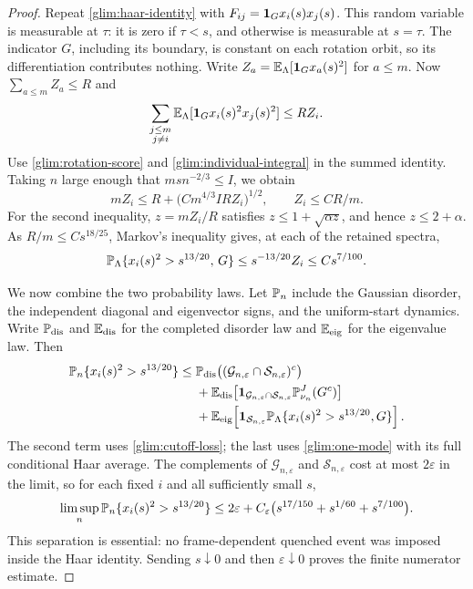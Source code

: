 \begin{proof}
Repeat \eqref{glim:haar-identity} with
\(F_{ij}=\mathbf 1_G x_i(s)x_j(s)\).  This random variable is measurable
at \(\tau\): it is zero if \(\tau<s\), and otherwise is measurable
at \(s=\tau\).  The indicator \(G\), including its boundary, is
constant on each rotation orbit, so its differentiation contributes
nothing.  Write \(Z_a=\mathbb E_\Lambda[\mathbf 1_G x_a(s)^2]\) for \(a\le m\).  Now
\(\sum_{a\le m} Z_a\le R\) and
\[
 \sum_{\substack{j\le m\\j\ne i}}\mathbb E_\Lambda[\mathbf 1_G x_i(s)^2x_j(s)^2]\le R Z_i.
\]
Use \eqref{glim:rotation-score} and
\eqref{glim:individual-integral} in the summed identity.  Taking \(n\)
large enough that \(m s n^{-2/3}\le I\), we obtain
\begin{equation}
 m Z_i\le R+\big(C m^{4/3} I R Z_i\big)^{1/2},
 \qquad Z_i\le C R/m.
 \label{glim:terminal-rotation}
\end{equation}
For the second inequality, \(z=mZ_i/R\) satisfies
\(z\le1+\sqrt{\alpha z}\), and hence \(z\le2+\alpha\).
As \(R/m\le C s^{18/25}\), Markov's inequality gives, at each of the
retained spectra,
\begin{equation}
 \mathbb P_\Lambda\{x_i(s)^2>s^{13/20},\,G\}
 \le s^{-13/20}Z_i\le C s^{7/100}.
 \label{glim:one-mode}
\end{equation}

We now combine the two probability laws.  Let \(\mathbb P_n\) include
the Gaussian disorder, the independent diagonal and eigenvector
signs, and the uniform-start dynamics.  Write \(\mathbb P_{\mathrm{dis}}\)
and \(\mathbb E_{\mathrm{dis}}\) for the completed disorder law and
\(\mathbb E_{\mathrm{eig}}\) for the eigenvalue law.  Then
\[
\begin{aligned}
 \mathbb P_n\{x_i(s)^2>s^{13/20}\}
 \le{}&
 \mathbb P_{\mathrm{dis}}\big((\mathcal G_{n,\varepsilon}
                         \cap\mathcal S_{n,\varepsilon})^c\big)\\
 &+\mathbb E_{\mathrm{dis}}\!\left[
   \mathbf 1_{\mathcal G_{n,\varepsilon}\cap\mathcal S_{n,\varepsilon}}
                   \mathbb P_{\nu_n}^J(G^c)\right]\\
 &+\mathbb E_{\mathrm{eig}}\!\left[
   \mathbf 1_{\mathcal S_{n,\varepsilon}}
      \mathbb P_\Lambda\{x_i(s)^2>s^{13/20},G\}\right].
\end{aligned}
\]
The second term uses \eqref{glim:cutoff-loss}; the last uses
\eqref{glim:one-mode} with its full conditional Haar average.
The complements of
\(\mathcal G_{n,\varepsilon}\) and \(\mathcal S_{n,\varepsilon}\)
cost at most \(2\varepsilon\) in the limit, so for
each fixed \(i\) and all sufficiently small \(s\),
\begin{equation}
 \limsup_n\mathbb P_n\{x_i(s)^2>s^{13/20}\}
 \le2\varepsilon+
 C_\varepsilon\big(s^{17/150}+s^{1/60}+s^{7/100}\big).
 \label{glim:finite-numerator}
\end{equation}
This separation is essential: no frame-dependent quenched event
was imposed inside the Haar identity.  Sending \(s\downarrow0\)
and then \(\varepsilon\downarrow0\) proves the finite numerator
estimate.


\end{proof}
